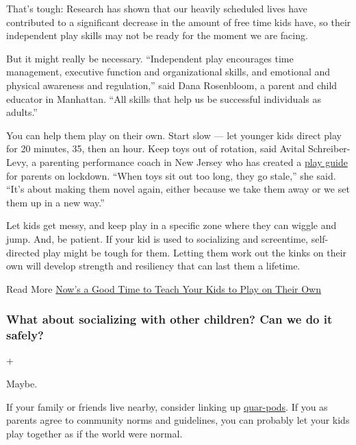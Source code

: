 That's tough: Research has shown that our heavily scheduled lives have
contributed to a significant decrease in the amount of free time kids
have, so their independent play skills may not be ready for the moment
we are facing.

But it might really be necessary. ``Independent play encourages time
management, executive function and organizational skills, and emotional
and physical awareness and regulation,'' said Dana Rosenbloom, a parent
and child educator in Manhattan. ``All skills that help us be successful
individuals as adults.''

You can help them play on their own. Start slow --- let younger kids
direct play for 20 minutes, 35, then an hour. Keep toys out of rotation,
said Avital Schreiber-Levy, a parenting performance coach in New Jersey
who has created a
\href{https://www.theparentingjunkie.com/wp-content/uploads/2020/03/PlayPandemic-Newer.pdf}{play
guide} for parents on lockdown. ``When toys sit out too long, they go
stale,'' she said. ``It's about making them novel again, either because
we take them away or we set them up in a new way.''

Let kids get messy, and keep play in a specific zone where they can
wiggle and jump. And, be patient. If your kid is used to socializing and
screentime, self-directed play might be tough for them. Letting them
work out the kinks on their own will develop strength and resiliency
that can last them a lifetime.

 Read More
\href{https://www.nytimes3xbfgragh.onion/2020/04/03/parenting/kids-independent-play-coronavirus-quarantine.html}{Now's
a Good Time to Teach Your Kids to Play on Their Own}

\hypertarget{what-about-socializing-with-other-children-can-we-do-it-safely}{%
\subsubsection{What about socializing with other children? Can we do it
safely?}\label{what-about-socializing-with-other-children-can-we-do-it-safely}}

+

Maybe.

If your family or friends live nearby, consider linking up
\href{https://www.nytimes3xbfgragh.onion/2020/06/09/parenting/coronavirus-pod-family.html}{quar-pods}.
If you as parents agree to community norms and guidelines, you can
probably let your kids play together as if the world were normal.

